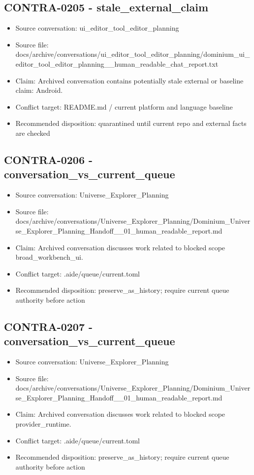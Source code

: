 \documentclass[11pt,a4paper]{report}
\begin{document}
\subsection{CONTRA-0205 - stale\_external\_claim}

\begin{itemize}
\item Source conversation: ui\_editor\_tool\_editor\_planning
\item Source file: docs/archive/conversations/ui\_editor\_tool\_editor\_planning/dominium\_ui\_editor\_tool\_editor\_planning\_\_human\_readable\_chat\_report.txt
\item Claim: Archived conversation contains potentially stale external or baseline claim: Android.
\item Conflict target: README.md / current platform and language baseline
\item Recommended disposition: quarantined until current repo and external facts are checked
\end{itemize}

\subsection{CONTRA-0206 - conversation\_vs\_current\_queue}

\begin{itemize}
\item Source conversation: Universe\_Explorer\_Planning
\item Source file: docs/archive/conversations/Universe\_Explorer\_Planning/Dominium\_Universe\_Explorer\_Planning\_Handoff\_\_01\_human\_readable\_report.md
\item Claim: Archived conversation discusses work related to blocked scope broad\_workbench\_ui.
\item Conflict target: .aide/queue/current.toml
\item Recommended disposition: preserve\_as\_history; require current queue authority before action
\end{itemize}

\subsection{CONTRA-0207 - conversation\_vs\_current\_queue}

\begin{itemize}
\item Source conversation: Universe\_Explorer\_Planning
\item Source file: docs/archive/conversations/Universe\_Explorer\_Planning/Dominium\_Universe\_Explorer\_Planning\_Handoff\_\_01\_human\_readable\_report.md
\item Claim: Archived conversation discusses work related to blocked scope provider\_runtime.
\item Conflict target: .aide/queue/current.toml
\item Recommended disposition: preserve\_as\_history; require current queue authority before action
\end{itemize}
\end{document}
